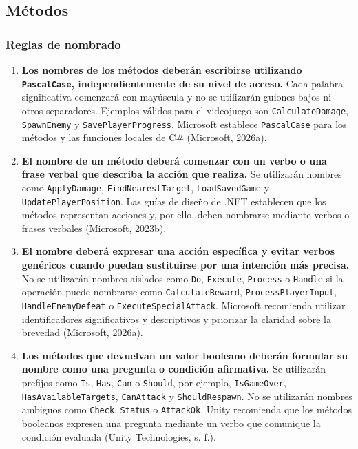 \subsection{Métodos}

\subsubsection{Reglas de nombrado}

\begin{enumerate}
  \item \textbf{Los nombres de los métodos deberán escribirse utilizando \texttt{PascalCase}, independientemente de su nivel de acceso.} Cada palabra significativa comenzará con mayúscula y no se utilizarán guiones bajos ni otros separadores. Ejemplos válidos para el videojuego son \texttt{CalculateDamage}, \texttt{SpawnEnemy} y \texttt{SavePlayerProgress}. Microsoft establece \texttt{PascalCase} para los métodos y las funciones locales de C\# (Microsoft, 2026a).

  \item \textbf{El nombre de un método deberá comenzar con un verbo o una frase verbal que describa la acción que realiza.} Se utilizarán nombres como \texttt{ApplyDamage}, \texttt{FindNearestTarget}, \texttt{LoadSavedGame} y \texttt{UpdatePlayerPosition}. Las guías de diseño de .NET establecen que los métodos representan acciones y, por ello, deben nombrarse mediante verbos o frases verbales (Microsoft, 2023b).

  \item \textbf{El nombre deberá expresar una acción específica y evitar verbos genéricos cuando puedan sustituirse por una intención más precisa.} No se utilizarán nombres aislados como \texttt{Do}, \texttt{Execute}, \texttt{Process} o \texttt{Handle} si la operación puede nombrarse como \texttt{CalculateReward}, \texttt{ProcessPlayerInput}, \texttt{HandleEnemyDefeat} o \texttt{ExecuteSpecialAttack}. Microsoft recomienda utilizar identificadores significativos y descriptivos y priorizar la claridad sobre la brevedad (Microsoft, 2026a).

  \item \textbf{Los métodos que devuelvan un valor booleano deberán formular su nombre como una pregunta o condición afirmativa.} Se utilizarán prefijos como \texttt{Is}, \texttt{Has}, \texttt{Can} o \texttt{Should}, por ejemplo, \texttt{IsGameOver}, \texttt{HasAvailableTargets}, \texttt{CanAttack} y \texttt{ShouldRespawn}. No se utilizarán nombres ambiguos como \texttt{Check}, \texttt{Status} o \texttt{AttackOk}. Unity recomienda que los métodos booleanos expresen una pregunta mediante un verbo que comunique la condición evaluada (Unity Technologies, s. f.).


\end{enumerate}
